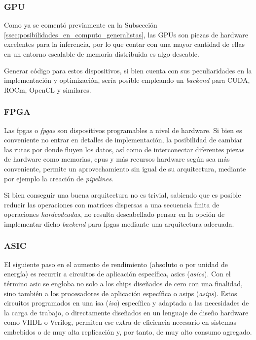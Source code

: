 \subsubsection{GPU}
\label{sssec:heterogeneas_gpu}
Como ya se comentó previamente en la Subsección \ref{ssec:posibilidades_en_computo_generalistas}, las GPUs son piezas de hardware excelentes para la inferencia, por lo que contar con una mayor cantidad de ellas en un entorno escalable de memoria distribuida es algo deseable.

Generar código para estos dispositivos, si bien cuenta con sus peculiaridades en la implementación y optimización, sería posible empleando un \textit{backend} para CUDA, ROCm, OpenCL y similares.

\subsubsection{FPGA}
\label{sssec:heterogeneas_fpga}
Las \acrshort{fpga}s o \textit{\acrlong{fpga}s} son dispositivos programables a nivel de hardware. Si bien es conveniente no entrar en detalles de implementación, la posibilidad de cambiar las rutas por donde fluyen los datos, así como de interconectar diferentes piezas de hardware como memorias, \acrshort{cpu}s y más recursos hardware según sea más conveniente, permite un aprovechamiento sin igual de su arquitectura, mediante por ejemplo la creación de \textit{pipelines}.

Si bien conseguir una buena arquitectura no es trivial, sabiendo que es posible reducir las operaciones con matrices dispersas a una secuencia finita de operaciones \textit{hardcodeadas}, no resulta descabellado pensar en la opción de implementar dicho \textit{backend} para \acrshort{fpga}s mediante una arquitectura adecuada.

\subsubsection{ASIC}
\label{sssec:heterogeneas_asic}
El siguiente paso en el aumento de rendimiento (absoluto o por unidad de energía) es recurrir a circuitos de aplicación específica, \acrshort{asic}s (\textit{\acrlong{asic}s}). Con el término \acrshort{asic} se engloba no solo a los chips diseñados de cero con una finalidad, sino también a los procesadores de aplicación específica o \acrshort{asip}s (\textit{\acrlong{asip}s}). Estos circuitos programados en una \acrshort{isa} (\textit{\acrlong{isa}}) específica y adaptada a las necesidades de la carga de trabajo, o directamente diseñados en un lenguaje de diseño hardware como VHDL o Verilog, permiten ese extra de eficiencia necesario en sistemas embebidos o de muy alta replicación y, por tanto, de muy alto consumo agregado.

